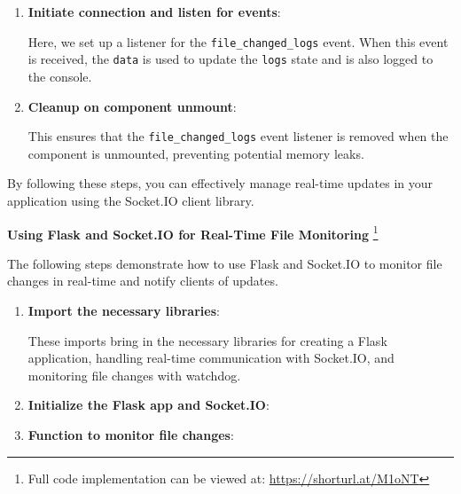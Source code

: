 \begin{itemize}
\begin{enumerate}
    \item \textbf{Initiate connection and listen for events}:

\vspace{-2mm}
    Here, we set up a listener for the \texttt{file\_changed\_logs} event. When this event is received, the \texttt{data} is used to update the \texttt{logs} state and is also logged to the console.
\newpage
    \item \textbf{Cleanup on component unmount}:

    This ensures that the \texttt{file\_changed\_logs} event listener is removed when the component is unmounted, preventing potential memory leaks.
\end{enumerate}

By following these steps, you can effectively manage real-time updates in your application using the Socket.IO client library.

\textbf{Using Flask and Socket.IO for Real-Time File Monitoring} \footnote{Full code implementation can be viewed at: \url{https://shorturl.at/M1oNT}}

The following steps demonstrate how to use Flask and Socket.IO to monitor file changes in real-time and notify clients of updates.

\begin{enumerate}
    \item \textbf{Import the necessary libraries}:

    

    \vspace{-2mm}
    
    These imports bring in the necessary libraries for creating a Flask application, handling real-time communication with Socket.IO, and monitoring file changes with watchdog.

    \item \textbf{Initialize the Flask app and Socket.IO}:
    
\newpage
    \item \textbf{Function to monitor file changes}:
    \vspace{2mm}
    


\end{enumerate}
\end{itemize}
